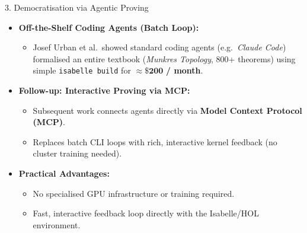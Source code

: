 \documentclass[compress,10pt,xcolor=dvipsnames]{beamer}
\begin{document}
\begin{frame}{3. Democratisation via Agentic Proving}

\begin{itemize}
  \item<1-> \textbf{Off-the-Shelf Coding Agents (Batch Loop):}
    \begin{itemize}
      \item Josef Urban et al.\ showed standard coding agents (e.g.\ \emph{Claude Code}) formalised an entire textbook (\emph{Munkres Topology}, 800+ theorems) using simple \texttt{isabelle build} for $\approx \mathbf{\$200}$ \textbf{/ month}.
    \end{itemize}
  \vspace{0.6em}
  \item<2-> \textbf{Follow-up: Interactive Proving via MCP:}
    \begin{itemize}
      \item Subsequent work connects agents directly via \textbf{Model Context Protocol (MCP)}.
      \item Replaces batch CLI loops with rich, interactive kernel feedback (no cluster training needed).
    \end{itemize}
  \vspace{0.6em}
  \item<3-> \textbf{Practical Advantages:}
    \begin{itemize}
      \item No specialised GPU infrastructure or training required.
      \item Fast, interactive feedback loop directly with the Isabelle/HOL environment.
    \end{itemize}
\end{itemize}
\end{frame}
\end{document}
